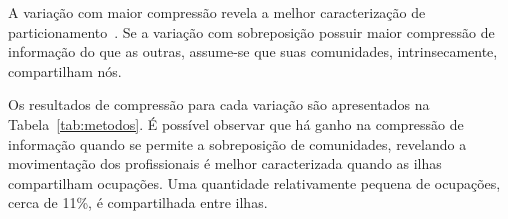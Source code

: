 \documentclass[
  article,
  11pt,
  a4paper,
  english,
  brazil,
  sumario=tradicional]{abntex2}
\begin{document}
A variação com maior compressão revela a melhor caracterização de particionamento~\cite{Viamontes_Esquivel2011-it,Rosvall2011-yi,Edler2017-kt}. Se a variação com sobreposição possuir maior compressão de informação do que as outras, assume-se que suas comunidades, intrinsecamente, compartilham nós.

Os resultados de compressão para cada variação são apresentados na Tabela~\ref{tab:metodos}. É possível observar que há ganho na compressão de informação quando se permite a sobreposição de comunidades, revelando a movimentação dos profissionais é melhor caracterizada quando as ilhas compartilham ocupações. Uma quantidade relativamente pequena de ocupações,  cerca de 11\%, é compartilhada entre ilhas.

\end{document}
